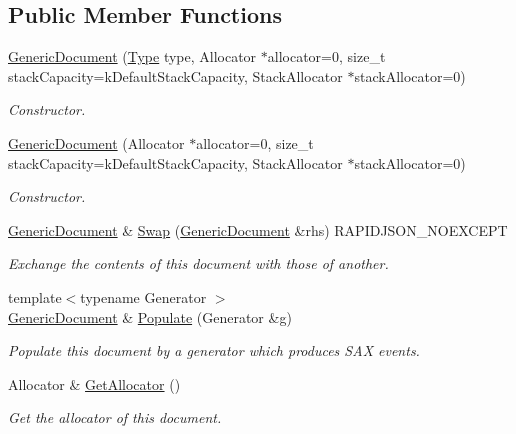 \subsection*{Public Member Functions}
\begin{DoxyCompactItemize}
\item 
\hyperlink{a01996_a3da21e72ec8f26b9da77d86cc1d41cdd}{Generic\+Document} (\hyperlink{a00560_a1d1cfd8ffb84e947f82999c682b666a7}{Type} type, Allocator $\ast$allocator=0, size\+\_\+t stack\+Capacity=k\+Default\+Stack\+Capacity, Stack\+Allocator $\ast$stack\+Allocator=0)
\begin{DoxyCompactList}\small\item\em Constructor. \end{DoxyCompactList}\item 
\hyperlink{a01996_a6b1c313ad538cafc4d23d4bd5f97178c}{Generic\+Document} (Allocator $\ast$allocator=0, size\+\_\+t stack\+Capacity=k\+Default\+Stack\+Capacity, Stack\+Allocator $\ast$stack\+Allocator=0)
\begin{DoxyCompactList}\small\item\em Constructor. \end{DoxyCompactList}\item 
\hyperlink{a01996}{Generic\+Document} \& \hyperlink{a01996_a6290e1290fad74177625af5938c0c58f}{Swap} (\hyperlink{a01996}{Generic\+Document} \&rhs) R\+A\+P\+I\+D\+J\+S\+O\+N\+\_\+\+N\+O\+E\+X\+C\+E\+PT
\begin{DoxyCompactList}\small\item\em Exchange the contents of this document with those of another. \end{DoxyCompactList}\item 
{\footnotesize template$<$typename Generator $>$ }\\\hyperlink{a01996}{Generic\+Document} \& \hyperlink{a01996_a36fbc7d0a9595d26e0d2c8859d207d1f}{Populate} (Generator \&g)
\begin{DoxyCompactList}\small\item\em Populate this document by a generator which produces S\+AX events. \end{DoxyCompactList}\item 
\mbox{\label{a01996_aa4609d6b19f86aec1a6b96edf2c27686}} 
Allocator \& \hyperlink{a01996_aa4609d6b19f86aec1a6b96edf2c27686}{Get\+Allocator} ()
\begin{DoxyCompactList}\small\item\em Get the allocator of this document. \end{DoxyCompactList}\item 

\end{DoxyCompactItemize}
